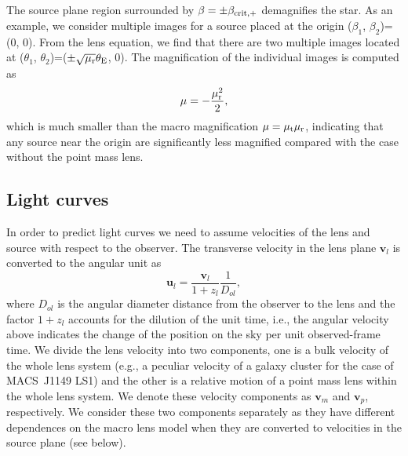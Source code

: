 \documentclass[showpacs,twocolumn,preprintnumbers,amsmath,amssymb,superscriptaddress,nofootinbib]{revtex4}
\begin{document}
The source plane region surrounded by $\beta=\pm\beta_{\rm crit,+}$
demagnifies the star. As an example, we consider multiple images for a
source placed at the origin ($\beta_1$, $\beta_2$)=(0, 0). From the lens
equation, we find that there are two multiple images located at
($\theta_1$, $\theta_2$)=($\pm\sqrt{\mu_{\rm r}}\theta_{\rm E}$, 0).
The magnification of the individual images is computed as
\begin{equation}
\mu=-\frac{\mu_{\rm r}^2}{2},
\end{equation}
which is much smaller than the macro magnification $\mu=\mu_{\rm
  t}\mu_{\rm r}$, indicating that any source near the origin are
significantly less magnified compared with the case without the point
mass lens. 

\subsection{Light curves}
\label{sec:lightcurve}

In order to predict light curves we need to assume velocities of
the lens and source with respect to the observer. The transverse
velocity in the lens plane $\mathbf{v}_l$ is converted to the angular
unit as 
\begin{equation}
\mathbf{u}_l = \frac{\mathbf{v}_l}{1+z_l}\frac{1}{D_{ol}},
\end{equation}
where $D_{ol}$ is the angular diameter distance from the observer to
the lens and the factor $1+z_l$ accounts for the dilution of the unit
time, i.e., the angular velocity above indicates the change of the
position on the sky per unit observed-frame time. We divide the lens
velocity into two components, one is a bulk velocity of the whole lens
system (e.g., a peculiar velocity of a galaxy cluster for the case
of MACS~J1149 LS1) and the other is a relative motion of a point mass
lens within the whole lens system. We denote these velocity components
as $\mathbf{v}_m$ and $\mathbf{v}_p$, respectively. We consider these
two components separately as they have different dependences on the
macro lens model  when they are converted to velocities in the source
plane (see below). 
\end{document}
